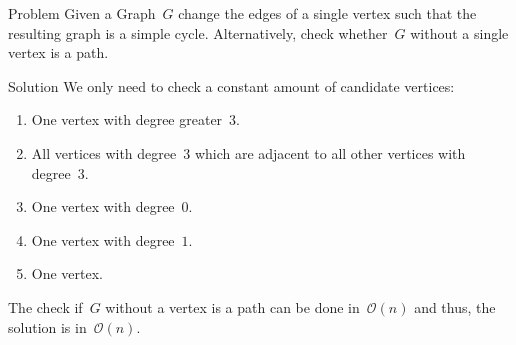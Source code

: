 \begin{slide}
	\begin{block}{Problem}
		Given a Graph~$G$ change the edges of a single vertex such that the resulting graph is a simple cycle.
		\pause
		Alternatively, check whether~$G$ without a single vertex is a path.
	\end{block}
	\pause
	\begin{block}{Solution}
		We only need to check a constant amount of candidate vertices:
		\begin{enumerate}
			\item One vertex with degree greater~$3$.
			\item All vertices with degree~$3$ which are adjacent to all other vertices with degree~$3$.
			\item One vertex with degree~$0$.
			\item One vertex with degree~$1$.
			\item One vertex.
		\end{enumerate}
		The check if~$G$ without a vertex is a path can be done in~$\mathcal{O}(n)$ and thus, the solution is in~$\mathcal{O}(n)$.
	\end{block}
\end{slide}
